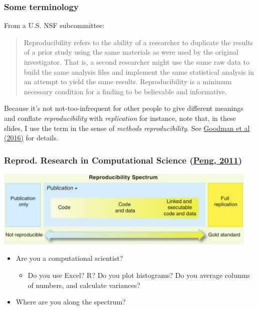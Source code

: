 \documentclass[c]{beamer} %
\begin{document}
\begin{frame}
  \frametitle{Some terminology}
  From a U.S. NSF subcommittee:
  \begin{quote}
    Reproducibility refers to the ability of a researcher to duplicate the results of a prior study using the same materials as were used by the original investigator. That is, a second researcher might use the same raw data to build the same analysis files and implement the same statistical analysis in an attempt to yield the same results. Reproducibility is a minimum necessary condition for a finding to be believable and informative.
  \end{quote}
  
  \bigskip
  
  Because it's not not-too-infrequent for other people to give different meanings and conflate \emph{reproducibility} with \emph{replication} for instance, note that, in these slides, I use the term in the sense of \emph{methods reproducibility}. See \href{http://dx.doi.org/10.1126/scitranslmed.aaf5027}{Goodman et al (2016)} for details.
\end{frame}

\begin{frame}
  \frametitle{Reprod. Research in Computational Science (\href{http://dx.doi.org/10.1126/science.1213847}{Peng, 2011})}
  \begin{center}
    \includegraphics[width=0.95\textwidth,height=0.90\textheight,keepaspectratio=true]{peng_11_reproducible-research_fig1}%
  \end{center}
  \pause
  \begin{itemize}
  \item Are you a computational scientist?
    \pause
    \begin{itemize}
    \item Do you use Excel? R? Do you plot histograms? Do you average columns of numbers, and calculate variances?
    \end{itemize}
    \bigskip
    \pause
  \item Where are you along the spectrum?
  \end{itemize}
\end{frame}
\end{document}

